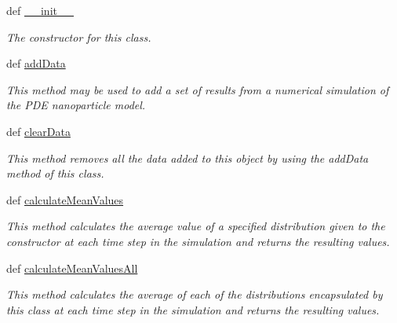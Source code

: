 \begin{DoxyCompactItemize}
\item 
def \hyperlink{class_distribution_data_processor_1_1_distribution_data_processor_a962229600d9585362c5be55f5d15f233}{\_\-\_\-init\_\-\_\-}
\begin{DoxyCompactList}\small\item\em The constructor for this class. \item\end{DoxyCompactList}\item 
def \hyperlink{class_distribution_data_processor_1_1_distribution_data_processor_a92627f9df54bd7c1e2a6f5e92939c717}{addData}
\begin{DoxyCompactList}\small\item\em This method may be used to add a set of results from a numerical simulation of the PDE nanoparticle model. \item\end{DoxyCompactList}\item 
def \hyperlink{class_distribution_data_processor_1_1_distribution_data_processor_ab439de520df4954c83acb1195a566756}{clearData}
\begin{DoxyCompactList}\small\item\em This method removes all the data added to this object by using the addData method of this class. \item\end{DoxyCompactList}\item 
def \hyperlink{class_distribution_data_processor_1_1_distribution_data_processor_ae24b9219d16bfd69f327cbb7d49469d7}{calculateMeanValues}
\begin{DoxyCompactList}\small\item\em This method calculates the average value of a specified distribution given to the constructor at each time step in the simulation and returns the resulting values. \item\end{DoxyCompactList}\item 
def \hyperlink{class_distribution_data_processor_1_1_distribution_data_processor_acbaf028bc14b1ea34f29f650a1f4e387}{calculateMeanValuesAll}
\begin{DoxyCompactList}\small\item\em This method calculates the average of each of the distributions encapsulated by this class at each time step in the simulation and returns the resulting values. \item\end{DoxyCompactList}\item 

\end{DoxyCompactItemize}
